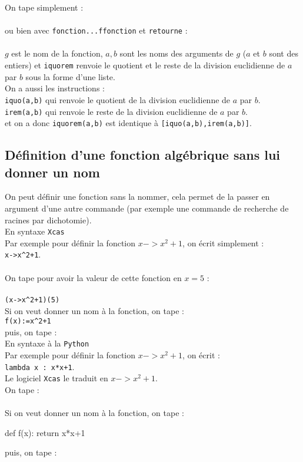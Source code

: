 \documentclass[12pt,a4paper]{book}
\begin{document}
\begin{giacjshere}
On tape simplement :\\
\\
ou bien  avec {\tt fonction...ffonction} et {\tt retourne} : \\
\\
$g$ est le nom de la fonction, $a,b$ sont les noms des arguments de $g$ ($a$ et
$b$ sont des entiers) et {\tt iquorem} renvoie le quotient et le reste de la 
division euclidienne de $a$ par $b$ sous la forme d'une liste.\\
On a aussi les instructions :\\
{\tt iquo(a,b)} qui renvoie le quotient de la division euclidienne de $a$ par 
$b$.\\
{\tt irem(a,b)} qui renvoie le reste de la division euclidienne de $a$ par $b$.\\
et on a donc {\tt iquorem(a,b)} est identique \`a {\tt [iquo(a,b),irem(a,b)]}.\\

\subsection{D\'efinition d'une fonction alg\'ebrique 
sans lui donner un nom}\index{->}
On peut d\'efinir une fonction sans la nommer, cela permet de la
passer en argument d'une autre commande (par exemple une commande
de recherche de racines par dichotomie).\\
En syntaxe {\tt Xcas}\\
Par exemple pour d\'efinir la fonction $x->x^2+1$, on \'ecrit simplement :\\
{\tt x->x\verb|^|2+1}.\\
\\
On tape pour avoir la valeur de cette fonction en $x=5$ :\\
\\{\tt  (x->x\verb|^|2+1)(5)}\\
Si on veut donner un nom \`a la fonction, on tape :\\
{\tt  f(x):=x\verb|^|2+1}\\
 puis, on tape :\\
En syntaxe \`a la {\tt Python}\\
Par exemple pour d\'efinir la fonction $x->x^2+1$, on \'ecrit :\\
{\tt lambda x  : x*x+1}.\\
Le logiciel {\tt Xcas} le traduit en $x->x^2+1$.\\
On tape :\\
\\
Si on veut donner un nom \`a la fonction, on tape :\\
\begin{giacprog}
def f(x):
    return x*x+1
\end{giacprog}
puis, on tape :\\


\end{giacjshere}
\end{document}
